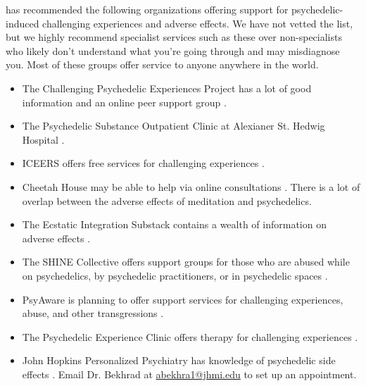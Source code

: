 \documentclass[12pt,letterpaper]{book}
\begin{document}
\textcite{supportNetwork} has recommended the following organizations offering support for psychedelic-induced challenging experiences and adverse effects. We have not vetted the list, but we highly recommend specialist services such as these over non-specialists who likely don't understand what you're going through and may misdiagnose you. Most of these groups offer service to anyone anywhere in the world.
\begin{itemize}
	\item The Challenging Psychedelic Experiences Project has a lot of good information and an online peer support group \cite{peersupportgroup}.
	\item The Psychedelic Substance Outpatient Clinic at Alexianer St. Hedwig Hospital \cite{alexianerClinic}.
	\item ICEERS offers free services for challenging experiences \cite{iceers}.
	\item Cheetah House may be able to help via online consultations \cite{cheetahHouse}. There is a lot of overlap between the adverse effects of meditation and psychedelics.
	\item The Ecstatic Integration Substack contains a wealth of information on adverse effects \cite{ecstaticIntegration}.
	\item The SHINE Collective offers support groups for those who are abused while on psychedelics, by psychedelic practitioners, or in psychedelic spaces \cite{shineCollective}.
	\item PsyAware is planning to offer support services for challenging experiences, abuse, and other transgressions \cite{psyaware}.
	\item The Psychedelic Experience Clinic offers therapy for challenging experiences \cite{rabbitClinic}.
	\item John Hopkins Personalized Psychiatry has knowledge of psychedelic side effects \cite{hopkinsPersonalized}. Email Dr. Bekhrad at \href{mailto:abekhra1@jhmi.edu}{abekhra1@jhmi.edu} to set up an appointment.
\end{itemize}
\end{document}
